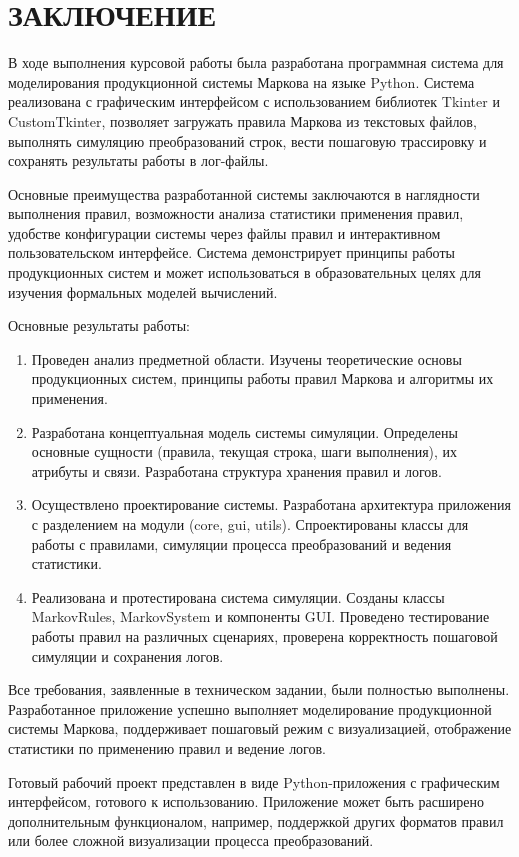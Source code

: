 \section*{ЗАКЛЮЧЕНИЕ}

В ходе выполнения курсовой работы была разработана программная система для моделирования продукционной системы Маркова на языке Python. Система реализована с графическим интерфейсом с использованием библиотек Tkinter и CustomTkinter, позволяет загружать правила Маркова из текстовых файлов, выполнять симуляцию преобразований строк, вести пошаговую трассировку и сохранять результаты работы в лог-файлы.

Основные преимущества разработанной системы заключаются в наглядности выполнения правил, возможности анализа статистики применения правил, удобстве конфигурации системы через файлы правил и интерактивном пользовательском интерфейсе. Система демонстрирует принципы работы продукционных систем и может использоваться в образовательных целях для изучения формальных моделей вычислений.

Основные результаты работы:

\begin{enumerate}
	\item Проведен анализ предметной области. Изучены теоретические основы продукционных систем, принципы работы правил Маркова и алгоритмы их применения.
	\item Разработана концептуальная модель системы симуляции. Определены основные сущности (правила, текущая строка, шаги выполнения), их атрибуты и связи. Разработана структура хранения правил и логов.
	\item Осуществлено проектирование системы. Разработана архитектура приложения с разделением на модули (core, gui, utils). Спроектированы классы для работы с правилами, симуляции процесса преобразований и ведения статистики.
	\item Реализована и протестирована система симуляции. Созданы классы MarkovRules, MarkovSystem и компоненты GUI. Проведено тестирование работы правил на различных сценариях, проверена корректность пошаговой симуляции и сохранения логов.
\end{enumerate}

Все требования, заявленные в техническом задании, были полностью выполнены. Разработанное приложение успешно выполняет моделирование продукционной системы Маркова, поддерживает пошаговый режим с визуализацией, отображение статистики по применению правил и ведение логов.

Готовый рабочий проект представлен в виде Python-приложения с графическим интерфейсом, готового к использованию. Приложение может быть расширено дополнительным функционалом, например, поддержкой других форматов правил или более сложной визуализации процесса преобразований.